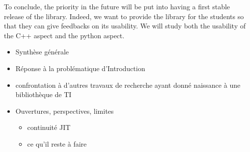 To conclude, the priority in the future will be put into having a first stable release of the library. Indeed, we want
to provide the library for the students so that they can give feedbacks on its usability. We will study both the
usability of the C++ aspect and the python aspect.


\clearpage


\begin{itemize}
  \item Synthèse générale
  \item Réponse à la problématique d'Introduction
  \item confrontation à d'autres travaux de recherche ayant donné naissance à une bibliothèque de TI
  \item Ouvertures, perspectives, limites
        \begin{itemize}
          \item continuité JIT
          \item ce qu'il reste à faire
        \end{itemize}
\end{itemize}
